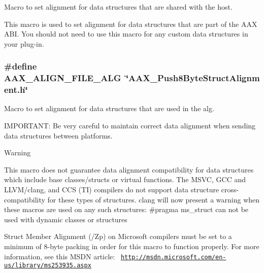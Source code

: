 Macro to set alignment for data structures that are shared with the host. 

This macro is used to set alignment for data structures that are part of the A\+A\+X A\+B\+I. You should not need to use this macro for any custom data structures in your plug-\/in. \hypertarget{a00149_a8fbeac3c5db5ac694e85a021ed74dc9e}{}
\subsubsection[{A\+A\+X\+\_\+\+A\+L\+I\+G\+N\+\_\+\+F\+I\+L\+E\+\_\+\+A\+L\+G}]{\setlength{\rightskip}{0pt plus 5cm}\#define A\+A\+X\+\_\+\+A\+L\+I\+G\+N\+\_\+\+F\+I\+L\+E\+\_\+\+A\+L\+G~\char`\"{}A\+A\+X\+\_\+\+Push8\+Byte\+Struct\+Alignment.\+h\char`\"{}}\label{a00149_a8fbeac3c5db5ac694e85a021ed74dc9e}


Macro to set alignment for data structures that are used in the alg. 

I\+M\+P\+O\+R\+T\+A\+N\+T\+: Be very careful to maintain correct data alignment when sending data structures between platforms.

\begin{DoxyWarning}{Warning}
\begin{DoxyItemize}
\item This macro does not guarantee data alignment compatibility for data structures which include base classes/structs or virtual functions. The M\+S\+V\+C, G\+C\+C and L\+L\+V\+M/clang, and C\+C\+S (T\+I) compilers do not support data structure cross-\/compatibility for these types of structures. clang will now present a warning when these macros are used on any such structures\+: {\ttfamily \#pragma ms\+\_\+struct can not be used with dynamic classes or structures} \item Struct Member Alignment (/\+Zp) on Microsoft compilers must be set to a minimum of 8-\/byte packing in order for this macro to function properly. For more information, see this M\+S\+D\+N article\+:~\newline
\href{http://msdn.microsoft.com/en-us/library/ms253935.aspx}{\tt http\+://msdn.\+microsoft.\+com/en-\/us/library/ms253935.\+aspx} \end{DoxyItemize}

\end{DoxyWarning}
\hypertarget{a00149_a8aaaefcc3d87025e84d5ccb99b650a87}{}
